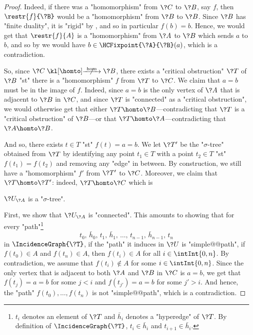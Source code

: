 \begin{proof}
	Indeed, if there was a "homomorphism" from $\?C$ to $\?B$, say $f$, then
	$\restr{f}{\?B}$ would be a "homomorphism" from $\?B$ to $\?B$.
	Since $\?B$ has "finite duality", it is "rigid" by , and so in particular $f(b) = b$.
	Hence, we would get that $\restr{f}{A}$ is a "homomorphism" from $\?A$ to $\?B$
	which sends $a$ to $b$, and so by 
	we would have $b \in \HCFixpoint{\?A}{\?B}(a)$, which is a contradiction.

	So, since $\?C \nothomto \?B$, there exists a "critical obstruction" $\?T$ of $\?B$
	"st" there is a "homomorphism" $f$ from $\?T$ to $\?C$. 
	We claim that $a=b$ must be in the image of $f$. Indeed, since $a=b$ is the only vertex
	of $\?A$ that is adjacent to $\?B$ in $\?C$, and since $\?T$ is "connected" as a
	"critical obstruction",
	we would otherwise get that either $\?T \homto \?B$---contradicting that $\?T$ is a "critical obstruction" of $\?B$---or that $\?T \homto \?A$---contradicting that $\?A \homto \?B$.
	
	And so, there exists $t \in T$ "st" $f(t) = a = b$.
	We let $\?T'$ be the "$\sigma$-tree" obtained from $\?T$ by identifying
	any point $t_1 \in T$ with a point $t_2 \in T$ "st" $f(t_1) = f(t_2)$
	and removing any "edge" in between.
	By construction, we still have a "homomorphism" $f'$ from $\?T'$ to $\?C$.
	Moreover, we claim that $\?T \homto \?T'$: indeed, $\?T \homto \?C$ which is  


	\begin{claim}
		\AP\label{claim:hyperedge-consistency-uniform-convergence-trees-are-trees}
		$\?U_{\?A}$ is a "$\sigma$-tree".
	\end{claim}
	First, we show that $\?U_{\?A}$ is "connected". This amounts to showing that for
	every "path"\footnote{$t_i$ denotes an element of $\?T$ and $\bar h_i$ denotes a "hyperedge" of $\?T$. By definition of $\IncidenceGraph{\?T}$, $t_i \in \bar h_i$ and
	$t_{i+1} \in \bar h_i$.}
	\[
		t_0,\, \bar h_0,\, t_1,\, \bar h_1,\, \dotsc,\, t_{n-1},\, \bar h_{n-1},\, t_n
	\]
	in $\IncidenceGraph{\?T}$, if the "path" it induces in $\?U$ is "simple@@path",
	if $f(t_0) \in A$ and $f(t_n) \in A$,
	then $f(t_i) \in A$ for all $i \in \intInt{0,n}$.
	By contradiction, we assume that $f(t_i) \not\in A$ for some $i \in \intInt{0,n}$.
	Since the only vertex that is adjacent to both $\?A$ and $\?B$ in $\?C$ is $a=b$,
	we get that $f(t_j) = a = b$ for some $j < i$ and $f(t_{j'}) = a = b$ for some $j' > i$.
	And hence, the "path" $f(t_0), \dotsc, f(t_n)$ is not "simple@@path", which is a contradiction.


\end{proof}
